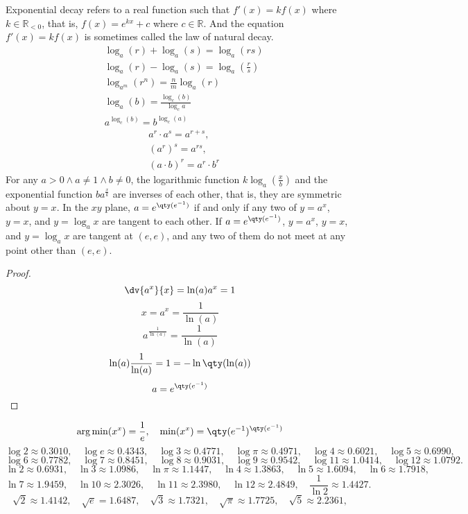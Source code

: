 \documentclass[a4paper,12pt]{article}
\begin{document}
Exponential decay refers to a real function such that $f'(x)=kf(x)$ where $k\in\mathbb{R}_{<0}$, that is, $f(x)=e^{kx}+c$ where $c\in\mathbb{R}$. And the equation $f'(x)=kf(x)$ is sometimes called the law of natural decay.
\[\begin{aligned}
& \log_a(r)+\log_a(s)=\log_a(rs)\\
& \log_a(r)-\log_a(s)=\log_a\left(\frac{r}{s}\right)\\
& \log_{a^m}(r^n)=\frac{n}{m}\log_a(r)\\
& \log_a(b)=\frac{\log_c(b)}{\log_c{a}}\\
& a^{\log_c(b)}=b^{\log_c(a)}
\end{aligned}\]
\[\begin{aligned}
& a^r\cdot a^s=a^{r+s},\\
& (a^r)^s=a^{rs},\\
& (a\cdot b)^r=a^r\cdot b^r
\end{aligned}\]
For any $a>0\land a\neq 1\land b\neq 0$, the logarithmic function $k\log_a\left(\frac{x}{b}\right)$ and the exponential function $ba^{\frac{x}{k}}$ are inverses of each other, that is, they are symmetric about $y=x$.
In the $xy$ plane, $a=e^{\qty(e^{-1})}$ if and only if any two of $y=a^x$, $y=x$, and $y=\log_ax$ are tangent to each other. If $a=e^{\qty(e^{-1})}$, $y=a^x$, $y=x$, and $y=\log_ax$ are tangent at $(e,e)$, and any two of them do not meet at any point other than $(e,e)$.
\begin{proof}
\[\dv{a^x}{x}=\ln(a)a^x=1\]
\[x=a^x=\frac{1}{\ln(a)}\]
\[a^{\frac{1}{\ln(a)}}=\frac{1}{\ln(a)}\]
\[\ln(a)\frac{1}{\ln(a)}=1=-\ln\qty(\ln(a))\]
\[a=e^{\qty(e^{-1})}\]
\end{proof}
\[\arg\min(x^x)=\frac{1}{e},\quad\min(x^x)=\qty(e^{-1})^{\qty(e^{-1})}\]
\[\log 2\approx 0.3010,\quad\log e\approx 0.4343,\quad\log 3\approx 0.4771,\quad\log\pi\approx 0.4971,\quad\log 4\approx 0.6021,\quad\log 5\approx 0.6990,\]
\[\log 6\approx 0.7782,\quad\log 7\approx 0.8451,\quad\log 8\approx 0.9031,\quad\log 9\approx 0.9542,\quad\log 11\approx 1.0414,\quad\log 12\approx 1.0792.\]
\[\ln 2\approx 0.6931,\quad\ln 3\approx 1.0986,\quad\ln\pi\approx 1.1447,\quad\ln 4\approx 1.3863,\quad\ln 5\approx 1.6094,\quad\ln 6\approx 1.7918,\]
\[\ln 7\approx 1.9459,\quad\ln 10\approx 2.3026,\quad\ln 11\approx 2.3980,\quad\ln 12\approx 2.4849,\quad\frac{1}{\ln 2}\approx 1.4427.\]
\[\sqrt{2}\approx 1.4142,\quad\sqrt{e}=1.6487,\quad\sqrt{3}\approx 1.7321,\quad\sqrt{\pi}\approx 1.7725,\quad\sqrt{5}\approx 2.2361,\]
\end{document}
